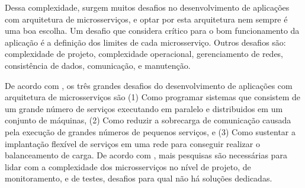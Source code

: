 Dessa complexidade, surgem muitos desafios no desenvolvimento de aplicações com arquitetura de microsserviços, e optar por esta arquitetura nem sempre é uma boa escolha. Um desafio que  considera crítico para o bom funcionamento da aplicação é a definição dos limites de cada microsserviço. Outros desafios são: complexidade de projeto, complexidade operacional, gerenciamento de redes, consistência de dados, comunicação, e manutenção. \cite{top10-microservices-challenges}

De acordo com , os três grandes desafios do desenvolvimento de aplicações com arquitetura de microsserviços são (1) Como programar sistemas que consistem de um grande número de serviços executando em paralelo e distribuidos em um conjunto de máquinas, (2) Como reduzir a sobrecarga de comunicação causada pela execução de grandes números de pequenos serviços, e (3) Como sustentar a implantação flexível de serviços em uma rede para conseguir realizar o balanceamento de carga. De acordo com , mais pesquisas são necessárias para lidar com a complexidade dos microsserviços no nível de projeto, de monitoramento, e de testes, desafios para qual não há soluções dedicadas.









